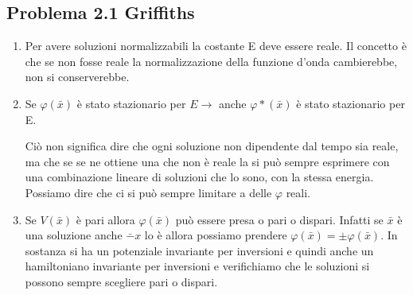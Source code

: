 \subsection{Problema 2.1 Griffiths} %
\begin{enumerate}
\item Per avere soluzioni normalizzabili la costante E deve essere reale. Il concetto è che se non fosse reale la normalizzazione della funzione d'onda cambierebbe, non si conserverebbe.

\item Se $\varphi\left(\bar x\right)$ è stato stazionario per $E \longrightarrow$ anche $\varphi*\left(\bar x\right)$ è stato stazionario per E.

Ciò non significa dire che ogni soluzione non dipendente dal tempo sia reale, ma che se se ne ottiene una che non è reale la si può sempre esprimere con una combinazione lineare di soluzioni che lo sono, con la stessa energia. Possiamo dire che ci si può sempre limitare a delle $\varphi$ reali.

\item Se $V\left(\bar x \right)$ è pari allora $\varphi\left(\bar  x \right)$ può essere presa o pari o dispari. Infatti se $\bar x$ è una soluzione anche $\bar -x$ lo è allora possiamo prendere $\varphi\left(\bar x \right)=\pm \varphi\left(\bar  x \right)$. In sostanza si ha un potenziale invariante per inversioni e quindi anche un hamiltoniano invariante per inversioni e verifichiamo che le soluzioni si possono sempre scegliere pari o dispari.

\end{enumerate}